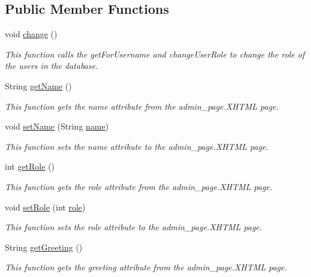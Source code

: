 \subsection*{Public Member Functions}
\begin{DoxyCompactItemize}
\item 
void \hyperlink{classorg_1_1jboss_1_1as_1_1quickstarts_1_1greeter_1_1web_1_1_admin_controller_a0f7cfe80e7838f569ca75a65bc2bba68}{change} ()
\begin{DoxyCompactList}\small\item\em This function calls the get\+For\+Username and change\+User\+Role to change the role of the users in the database. \end{DoxyCompactList}\item 
String \hyperlink{classorg_1_1jboss_1_1as_1_1quickstarts_1_1greeter_1_1web_1_1_admin_controller_aba57d038f9811614fcfaa22a88d1406e}{get\+Name} ()
\begin{DoxyCompactList}\small\item\em This function gets the name attribute from the admin\+\_\+page.\+X\+H\+T\+ML page. \end{DoxyCompactList}\item 
void \hyperlink{classorg_1_1jboss_1_1as_1_1quickstarts_1_1greeter_1_1web_1_1_admin_controller_a8d752b9819188487284f038c06d71cab}{set\+Name} (String \hyperlink{classorg_1_1jboss_1_1as_1_1quickstarts_1_1greeter_1_1web_1_1_admin_controller_a7ddbb57da6f36a78dcc0e75b45a8a7bc}{name})
\begin{DoxyCompactList}\small\item\em This function sets the name attribute to the admin\+\_\+page.\+X\+H\+T\+ML page. \end{DoxyCompactList}\item 
int \hyperlink{classorg_1_1jboss_1_1as_1_1quickstarts_1_1greeter_1_1web_1_1_admin_controller_afbbc28b489e553a9d1f60f85ce6e2188}{get\+Role} ()
\begin{DoxyCompactList}\small\item\em This function gets the role attribute from the admin\+\_\+page.\+X\+H\+T\+ML page. \end{DoxyCompactList}\item 
void \hyperlink{classorg_1_1jboss_1_1as_1_1quickstarts_1_1greeter_1_1web_1_1_admin_controller_a4e0f94bfafa76f931eb4c93c13dd262d}{set\+Role} (int \hyperlink{classorg_1_1jboss_1_1as_1_1quickstarts_1_1greeter_1_1web_1_1_admin_controller_ad54ca6c54ccdb72464120fa054c40664}{role})
\begin{DoxyCompactList}\small\item\em This function sets the role attribute to the admin\+\_\+page.\+X\+H\+T\+ML page. \end{DoxyCompactList}\item 
String \hyperlink{classorg_1_1jboss_1_1as_1_1quickstarts_1_1greeter_1_1web_1_1_admin_controller_ac2e8850b121c41e02714c4fea008dcfa}{get\+Greeting} ()
\begin{DoxyCompactList}\small\item\em This function gets the greeting attribute from the admin\+\_\+page.\+X\+H\+T\+ML page. \end{DoxyCompactList}\end{DoxyCompactItemize}
